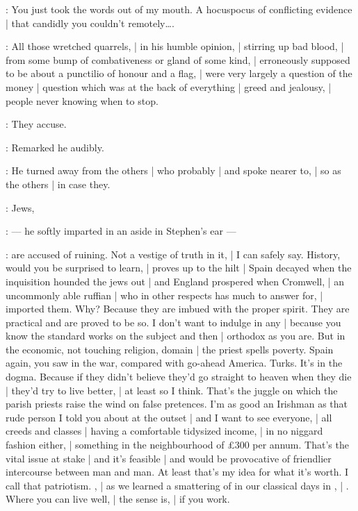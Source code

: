 \Bloom:
You just took the words out of my mouth.
A hocuspocus of conflicting evidence |
that candidly you couldn't remotely\ldots.

:
All those wretched quarrels, |
in his humble opinion, |
stirring up bad blood, |
from some bump of combativeness or gland of some kind, |
erroneously supposed to be
about a punctilio of honour and a flag, |
were very largely a question of the money |
question which was at the back of everything |
greed and jealousy, |
people never knowing when to stop.

\Bloom:
They accuse.

:
Remarked he audibly.

:
He turned away from the others |
who probably |
and spoke nearer to, |
so as the others |
in case they.

\Bloom:
Jews,

:
    --- he softly imparted in an aside in Stephen's ear ---

\Bloom:
are accused of ruining.
Not a vestige of truth in it, |
I can safely say.
History, would you be surprised to learn, |
proves up to the hilt |
Spain decayed when the inquisition hounded the jews out |
and England prospered when Cromwell, |
an uncommonly able ruffian |
who in other respects has much to answer for, |
imported them.
Why?
Because they are imbued with the proper spirit.
They are practical and are proved to be so.
I don't want to indulge in any |
because you know the standard works on the subject and then |
orthodox as you are.
But in the economic, not touching religion, domain |
the priest spells poverty.
Spain again, you saw in the war, compared with go-ahead America.
Turks.
It's in the dogma.
Because if they didn't believe they'd go straight to heaven when they die |
they'd try to live better, |
at least so I think.
That's the juggle on which the parish priests raise the wind on false pretences.
I'm
as good an Irishman as that rude person I told you about at the outset |
and I want to see everyone, |
all creeds and classes  |
having a comfortable tidysized income, |
in no niggard fashion either, |
something in the neighbourhood of £300 per annum.
That's the vital issue at stake |
and it's feasible |
and would be provocative of friendlier intercourse between man and man.
At least that's my idea for what it's worth.
I call that patriotism.
, |
as we learned a smattering of in our classical days in , |
.
Where you can live well, |
the sense is, |
if you work.

